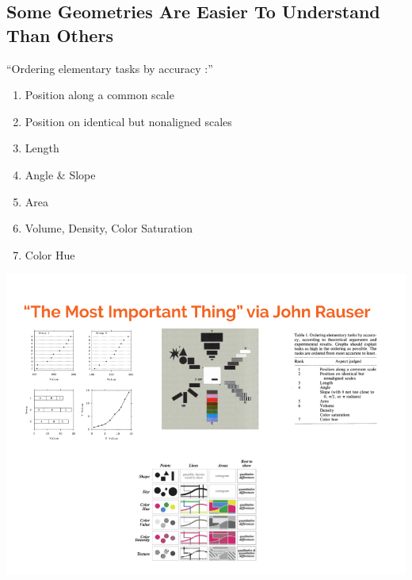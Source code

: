 \documentclass[]{tufte-handout}
\providecommand{\tightlist}{%
  \setlength{\itemsep}{0pt}\setlength{\parskip}{0pt}}
\begin{document}
\hypertarget{some-geometries-are-easier-to-understand-than-others}{%
\subsection{Some Geometries Are Easier To Understand Than
Others}\label{some-geometries-are-easier-to-understand-than-others}}

``Ordering elementary tasks by accuracy \citep{Cleveland1985}:''

\begin{enumerate}
\def\labelenumi{\arabic{enumi}.}
\tightlist
\item
  Position along a common scale
\item
  Position on identical but nonaligned scales
\item
  Length
\item
  Angle \& Slope
\item
  Area
\item
  Volume, Density, Color Saturation
\item
  Color Hue
\end{enumerate}

\includegraphics{Rauser-most-important-thing.png}


\end{document}
